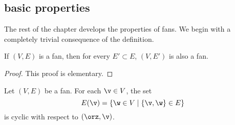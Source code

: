 
\subsection{basic properties}

The rest of the chapter develops the properties of fans.  We begin with
a completely trivial consequence of the definition.

\begin{lemma}[]\label{lemma:subset-fan}
If $(V,E)$ is a fan, then for every $E'\subset E$, $(V,E')$ is also
a fan.
\end{lemma}

\begin{proof} This proof is elementary.
\end{proof}

\begin{lemma}\cutrate{}  
Let $(V,E)$ be a fan.
For each $\v\in V$, the set
\[ 
E(\v) = \{\w\in V\mid \{\v,\w\}\in E\}
\] 
is cyclic with respect to $(\orz,\v)$.
\end{lemma}
%

